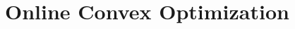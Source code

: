 \documentclass[../main.tex]{subfiles}
\begin{document}
\chapter{Online Convex Optimization}
\end{document}
